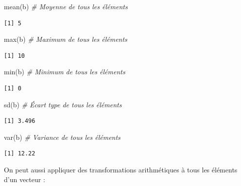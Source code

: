 \documentclass[
  12pt,
]{book}
\newenvironment{Shaded}{\begin{snugshade}}{\end{snugshade}}
\newcommand{\CommentTok}[1]{\textcolor[rgb]{0.56,0.35,0.01}{\textit{#1}}}
\newcommand{\FunctionTok}[1]{\textcolor[rgb]{0.00,0.00,0.00}{#1}}
\newcommand{\NormalTok}[1]{#1}
\begin{document}
\begin{Shaded}
\begin{Highlighting}[]
\FunctionTok{mean}\NormalTok{(b) }\CommentTok{\# Moyenne de tous les éléments}
\end{Highlighting}
\end{Shaded}

\begin{verbatim}
[1] 5
\end{verbatim}

\begin{Shaded}
\begin{Highlighting}[]
\FunctionTok{max}\NormalTok{(b) }\CommentTok{\# Maximum de tous les éléments}
\end{Highlighting}
\end{Shaded}

\begin{verbatim}
[1] 10
\end{verbatim}

\begin{Shaded}
\begin{Highlighting}[]
\FunctionTok{min}\NormalTok{(b) }\CommentTok{\# Minimum de tous les éléments}
\end{Highlighting}
\end{Shaded}

\begin{verbatim}
[1] 0
\end{verbatim}

\begin{Shaded}
\begin{Highlighting}[]
\FunctionTok{sd}\NormalTok{(b) }\CommentTok{\# Écart type de tous les éléments}
\end{Highlighting}
\end{Shaded}

\begin{verbatim}
[1] 3.496
\end{verbatim}

\begin{Shaded}
\begin{Highlighting}[]
\FunctionTok{var}\NormalTok{(b) }\CommentTok{\# Variance de tous les éléments}
\end{Highlighting}
\end{Shaded}

\begin{verbatim}
[1] 12.22
\end{verbatim}

On peut aussi appliquer des transformations arithmétiques à tous les éléments d'un vecteur :
\end{document}
